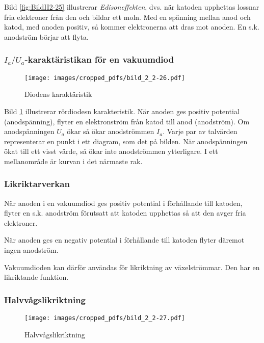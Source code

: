 Bild \ref{fig:BildII2-25} illustrerar \emph{Edisoneffekten}, dvs. när katoden
upphettas lossnar fria elektroner från den och bildar ett moln.
Med en spänning mellan anod och katod, med anoden positiv, så kommer
elektronerna att dras mot anoden.
En s.k. anodström börjar att flyta.

\subsubsection{\(I_a/U_a\)-karaktäristikan för en vakuumdiod}

\begin{figure}
\texttt{[image: images/cropped\_pdfs/bild\_2\_2-26.pdf]}
\caption{Diodens karaktäristik}
\label{fig:BildII2-26}
\end{figure}

Bild \ref{fig:BildII2-26} illustrerar rördiodesn karakteristik.
När anoden ges positiv potential (anodspänning), flyter en elektronström från
katod till anod (anodström).
Om anodspänningen \(U_a\) ökar så ökar anodströmmen \(I_a\).
Varje par av talvärden representerar en punkt i ett diagram, som det på bilden.
När anodspänningen ökat till ett visst värde, så ökar inte anodströmmen
ytterligare.
I ett mellanområde är kurvan i det närmaste rak.

\subsubsection{Likriktarverkan}

När anoden i en vakuumdiod ges positiv potential i förhållande till katoden,
flyter en s.k. anodström förutsatt att katoden upphettas så att den avger fria
elektroner.

När anoden ges en negativ potential i förhållande till katoden flyter däremot
ingen anodström.

Vakuumdioden kan därför användas för likriktning av växelströmmar. Den har en
likriktande funktion.

\subsubsection{Halvvågslikriktning}

\begin{figure}
\texttt{[image: images/cropped\_pdfs/bild\_2\_2-27.pdf]}
\caption{Halvvågslikriktning}
\label{fig:BildII2-27}
\end{figure}

